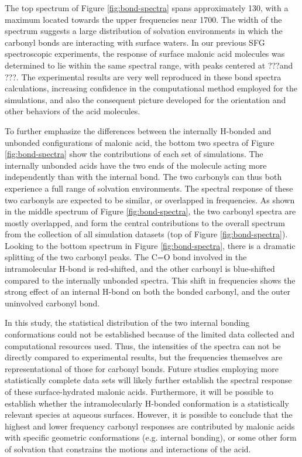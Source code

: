 The top spectrum of Figure \ref{fig:bond-spectra} spans approximately 130\cm, with a maximum located towards the upper frequencies near 1700\cm. The width of the spectrum suggests a large distribution of solvation environments in which the carbonyl bonds are interacting with surface waters. In our previous SFG spectroscopic experiments, the response of surface malonic acid molecules was determined to lie within the same spectral range, with peaks centered at ???\cm and ???\cm. The experimental results are very well reproduced in these bond spectra calculations, increasing confidence in the computational method employed for the simulations, and also the consequent picture developed for the orientation and other behaviors of the acid molecules.

To further emphasize the differences between the internally H-bonded and unbonded configurations of malonic acid, the bottom two spectra of Figure \ref{fig:bond-spectra} show the contributions of each set of simulations. The internally unbonded acids have the two ends of the molecule acting more independently than with the internal bond. The two carbonyls can thus both experience a full range of solvation environments. The spectral response of these two carbonyls are expected to be similar, or overlapped in frequencies. As shown in the middle spectrum of Figure \ref{fig:bond-spectra}, the two carbonyl spectra are mostly overlapped, and form the central contributions to the overall spectrum from the collection of all simulation datasets (top of Figure \ref{fig:bond-spectra}). Looking to the bottom spectrum in Figure \ref{fig:bond-spectra}, there is a dramatic splitting of the two carbonyl peaks. The C=O bond involved in the intramolecular H-bond is red-shifted, and the other carbonyl is blue-shifted compared to the internally unbonded spectra. This shift in frequencies shows the strong effect of an internal H-bond on both the bonded carbonyl, and the outer uninvolved carbonyl bond.

In this study, the statistical distribution of the two internal bonding conformations could not be established because of the limited data collected and computational resources used. Thus, the intensities of the spectra can not be directly compared to experimental results, but the frequencies themselves are representational of those for carbonyl bonds. Future studies employing more statistically complete data sets will likely further establish the spectral response of these surface-hydrated malonic acids. Furthermore, it will be possible to establish whether the intramolecularly H-bonded conformation is a statistically relevant species at aqueous surfaces. However, it is possible to conclude that the highest and lower frequency carbonyl responses are contributed by malonic acids with specific geometric conformations (e.g. internal bonding), or some other form of solvation that constrains the motions and interactions of the acid.
